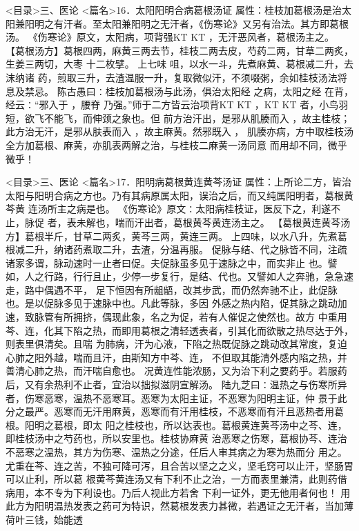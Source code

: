 \documentclass[a4paper,12pt,UTF8,twoside]{ctexbook}
\begin{document}
<目录>三、医论
<篇名>16．太阳阳明合病葛根汤证
属性：桂枝加葛根汤是治太阳兼阳明之有汗者。至太阳兼阳明之无汗者，《伤寒论》又另有治法。其方即葛根汤。 
《伤寒论》原文，太阳病，项背强KT KT ，无汗恶风者，葛根汤主之。 
【葛根汤方】葛根四两，麻黄三两去节，桂枝二两去皮，芍药二两，甘草二两炙，生姜三两切，大枣 
十二枚擘。 
上七味 咀，以水一斗，先煮麻黄、葛根减二升，去沫纳诸 
药，煎取三升，去渣温服一升，复取微似汗，不须啜粥，余如桂枝汤法将息及禁忌。 
陈古愚曰∶桂枝加葛根汤与此汤，俱治太阳经 之病，太阳之经 在背，经云∶“邪入于 ，腰脊 
乃强。”师于二方皆云治项背KT KT ，KT KT 者，小鸟羽短，欲飞不能飞，而伸颈之象也。但 
前方治汗出，是邪从肌腠而入 ，故主桂枝；此方治无汗，是邪从肤表而入 ，故主麻黄。然邪既入 ， 
肌腠亦病，方中取桂枝汤全方加葛根、麻黄，亦肌表两解之治，与桂枝二麻黄一汤同意 
而用却不同，微乎微乎！ 

<目录>三、医论
<篇名>17．阳明病葛根黄连黄芩汤证
属性：上所论二方，皆治太阳与阳明合病之方也。乃有其病原属太阳，误治之后，而又纯属阳明者，葛根黄芩黄 
连汤所主之病是也。 
《伤寒论》原文∶太阳病桂枝证，医反下之，利遂不止，脉促 
者，表未解也，喘而汗出者，葛根黄芩黄连汤主之。 
【葛根黄连黄芩汤方】葛根半斤，甘草二两炙，黄芩三两，黄连三两。 
上四味，以水八升，先煮葛根减二升，纳诸药煮取二升，去渣，分温再服。 
促脉与结、代之脉皆不同，注疏诸家多谓，脉动速时一止者曰促。夫促脉虽多见于速脉之中，而实非止 
也。譬如，人之行路，行行且止，少停一步复行，是结、代也。又譬如人之奔驰，急急速走，路中偶遇不平， 
足下恒因有所龃龉，改其步武，而仍然奔驰不止，此促脉也。是以促脉多见于速脉中也。凡此等脉，多因 
外感之热内陷，促其脉之跳动加速，致脉管有所拥挤，偶现此象，名之为促，若有人催促之使然也。故方 
中重用芩、连，化其下陷之热，而即用葛根之清轻透表者，引其化而欲散之热尽达于外，则表里俱清矣。且喘 
为肺病，汗为心液，下陷之热既促脉之跳动改其常度，复迫心肺之阳外越，喘而且汗，由斯知方中芩、连， 
不但取其能清外感内陷之热，并善清心肺之热，而汗喘自愈也。 
况黄连性能浓肠，又为治下利之要药乎。若服药后，又有余热利不止者，宜治以拙拟滋阴宣解汤。 
陆九芝曰∶温热之与伤寒所异者，伤寒恶寒，温热不恶寒耳。恶寒为太阳主证，不恶寒为阳明主证，仲 
景于此分之最严。恶寒而无汗用麻黄，恶寒而有汗用桂枝，不恶寒而有汗且恶热者用葛根。阳明之葛根，即太 
阳之桂枝也，所以达表也。葛根黄连黄芩汤中之芩、连，即桂枝汤中之芍药也，所以安里也。桂枝协麻黄 
治恶寒之伤寒，葛根协芩、连治不恶寒之温热，其方为伤寒、温热之分途，任后人审其病之为寒为热而分 
用之。尤重在芩、连之苦，不独可降可泻，且合苦以坚之之义，坚毛窍可以止汗，坚肠胃可以止利，所以葛 
根黄芩黄连汤又有下利不止之治，一方而表里兼清，此则药借病用，本不专为下利设也。乃后人视此方若舍 
下利一证外，更无他用者何也！ 
用此方为阳明温热发表之药可为特识，然葛根发表力甚微，若遇证之无汗者，当加薄荷叶三钱，始能透 
\end{document}
